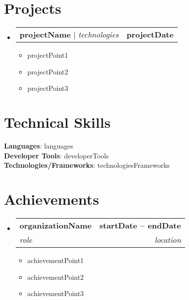 \documentclass[letterpaper,11pt]{article}
\makeatletter
\newcommand{\resumeItem}[1]{
  \item\small{
    {#1 \vspace{-2pt}}
  }
}
\newcommand{\resumeSubheading}[4]{
  \vspace{-2pt}\item
    \begin{tabular*}{1.0\textwidth}[t]{l@{\extracolsep{\fill}}r}
      \textbf{#1} & \textbf{\small #2} \\
      \textit{\small#3} & \textit{\small #4} \\
    \end{tabular*}\vspace{-7pt}
}
\newcommand{\resumeProjectHeading}[2]{
    \item
    \begin{tabular*}{1.001\textwidth}{l@{\extracolsep{\fill}}r}
      \small#1 & \textbf{\small #2}\\
    \end{tabular*}\vspace{-7pt}
}
\newcommand{\resumeSubHeadingListStart}{\begin{itemize}[leftmargin=0.0in, label={}]}
\newcommand{\resumeSubHeadingListEnd}{\end{itemize}}
\newcommand{\resumeItemListStart}{\begin{itemize}}
\newcommand{\resumeItemListEnd}{\end{itemize}\vspace{-5pt}}
\makeatother
\begin{document}
\section{Projects}
\vspace{-5pt}
\resumeSubHeadingListStart
  \resumeProjectHeading
      {\textbf{ {{projectName}} } $|$ \emph{ {{technologies}} }}{ {{projectDate}} }
      \resumeItemListStart
        \resumeItem{ {{projectPoint1}} }
        \resumeItem{ {{projectPoint2}} }
        \resumeItem{ {{projectPoint3}} }
      \resumeItemListEnd
      \vspace{-13pt}
\resumeSubHeadingListEnd
\vspace{-15pt}

%
\section{Technical Skills}
 \begin{itemize}[leftmargin=0.15in, label={}]
    \small{\item{
     \textbf{Languages}{: {{languages}}} \\
     \textbf{Developer Tools}{: {{developerTools}}} \\
     \textbf{Technologies/Frameworks}{: {{technologiesFrameworks}}} \\
    }}
 \end{itemize}
 \vspace{-16pt}

\section{Achievements}
\resumeSubHeadingListStart
    \resumeSubheading
        { {{organizationName}} }{ {{startDate}} -- {{endDate}} }{ {{role}} }{ {{location}} }
        \resumeItemListStart
            \resumeItem{ {{achievementPoint1}} }
            \resumeItem{ {{achievementPoint2}} }
            \resumeItem{ {{achievementPoint3}} }
        \resumeItemListEnd
\resumeSubHeadingListEnd
\end{document}
